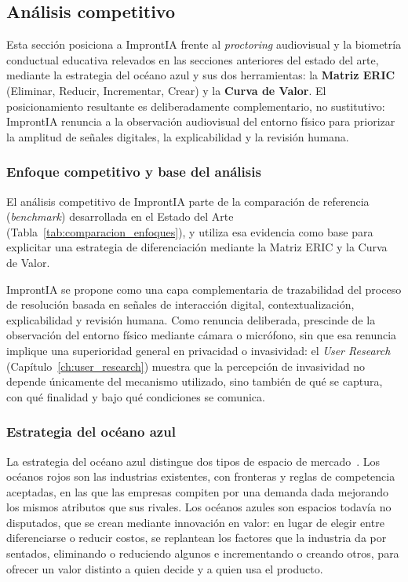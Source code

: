 \subsection{Análisis competitivo}
\label{ch:competencias}

Esta sección posiciona a ImprontIA frente al \textit{proctoring} audiovisual y la biometría conductual educativa relevados en las secciones anteriores del estado del arte, mediante la estrategia del océano azul y sus dos herramientas: la \textbf{Matriz ERIC} (Eliminar, Reducir, Incrementar, Crear) y la \textbf{Curva de Valor}. El posicionamiento resultante es deliberadamente complementario, no sustitutivo: ImprontIA renuncia a la observación audiovisual del entorno físico para priorizar la amplitud de señales digitales, la explicabilidad y la revisión humana.

\subsubsection{Enfoque competitivo y base del análisis}

El análisis competitivo de ImprontIA parte de la comparación de referencia (\textit{benchmark}) desarrollada en el Estado del Arte (Tabla~\ref{tab:comparacion_enfoques}), y utiliza esa evidencia como base para explicitar una estrategia de diferenciación mediante la Matriz ERIC y la Curva de Valor.

ImprontIA se propone como una capa complementaria de trazabilidad del proceso de resolución basada en señales de interacción digital, contextualización, explicabilidad y revisión humana. Como renuncia deliberada, prescinde de la observación del entorno físico mediante cámara o micrófono, sin que esa renuncia implique una superioridad general en privacidad o invasividad: el \textit{User Research} (Capítulo~\ref{ch:user_research}) muestra que la percepción de invasividad no depende únicamente del mecanismo utilizado, sino también de qué se captura, con qué finalidad y bajo qué condiciones se comunica.

\subsubsection{Estrategia del océano azul}
\label{sec:oceano_azul}

La estrategia del océano azul distingue dos tipos de espacio de mercado~\parencite{KimMauborgne2005}. Los océanos rojos son las industrias existentes, con fronteras y reglas de competencia aceptadas, en las que las empresas compiten por una demanda dada mejorando los mismos atributos que sus rivales. Los océanos azules son espacios todavía no disputados, que se crean mediante innovación en valor: en lugar de elegir entre diferenciarse o reducir costos, se replantean los factores que la industria da por sentados, eliminando o reduciendo algunos e incrementando o creando otros, para ofrecer un valor distinto a quien decide y a quien usa el producto.

